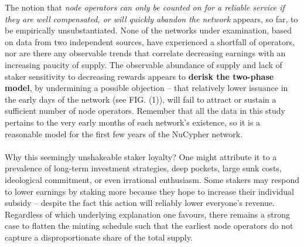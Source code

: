 \documentclass[longbibliography,nofootinbib]{revtex4-1}
\begin{document}
The notion that \textit{node operators can only be counted on for a reliable service if they are well compensated, or will quickly abandon the network} appears, so far, to be empirically unsubstantiated. None of the networks under examination, based on data from two independent sources, have experienced a shortfall of operators, nor are there any observable trends that correlate decreasing earnings with an increasing paucity of supply. The observable abundance of supply and lack of staker sensitivity to decreasing rewards appears to \textbf{derisk the two-phase model}, by undermining a possible objection – that relatively lower issuance in the early days of the network (see FIG. (1)), will fail to attract or sustain a sufficient number of node operators. Remember that all the data in this study pertains to the very early months of each network's existence, so it is a reasonable model for the first few years of the NuCypher network.
\\\\ 
Why this seemingly unshakeable staker loyalty? One might attribute it to a prevalence of long-term investment strategies, deep pockets, large sunk costs, ideological commitment, or even irrational enthusiasm. Some stakers may respond to lower earnings by staking more because they hope to increase their individual subsidy – despite the fact this action will reliably lower everyone's revenue. Regardless of which underlying explanation one favours, there remains a strong case to flatten the minting schedule such that the earliest node operators do not capture a disproportionate share of the total supply.
\end{document}
